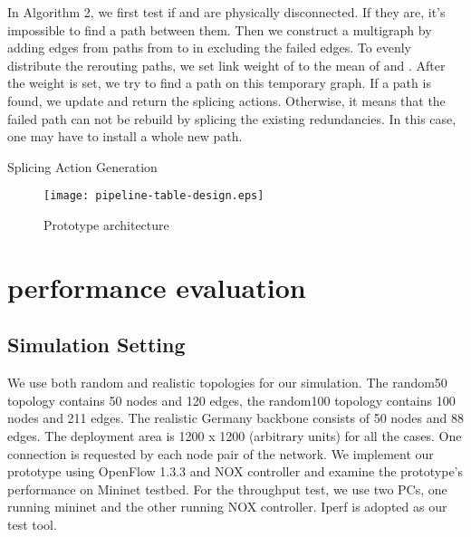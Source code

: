 \documentclass[10pt,journal]{IEEEtran}
\begin{document}
In Algorithm 2, we first test if  and  are physically disconnected. If they are, it's impossible to find a path between them. Then we construct a multigraph  by adding edges from  paths from  to  in  excluding the failed edges. To evenly distribute the rerouting paths, we set link weight of  to the mean of  and . After the weight is set, we try to find a path on this temporary graph. If a path is found, we update  and return the splicing actions. Otherwise, it means that the failed path can not be rebuild by splicing the existing redundancies. In this case, one may have to install a whole new path.
\begin{algorithm}[!ht]
\caption{Splicing Action Generation}
\label{algo:s_a_g}
\end{algorithm}


\begin{figure}[!h]
 \begin{center}
		\texttt{[image: pipeline-table-design.eps]}
	\caption{Prototype architecture}
	\label{fig:proposed_architecture}
 \end{center}
\end{figure}


\section{performance evaluation}\label{sec:performance_evaluation}
\subsection{Simulation Setting}
 We use both random and realistic topologies for our simulation. The random50 topology contains 50 nodes and 120 edges, the random100 topology contains 100 nodes and 211 edges. The realistic Germany backbone consists of 50 nodes and 88 edges. The deployment area is 1200 x 1200 (arbitrary units) for all the cases. One connection is requested by each node pair of the network. We implement our prototype using OpenFlow 1.3.3\cite{specification2013version} and NOX controller\cite{gude2008nox} and examine the prototype's performance on Mininet testbed\cite{lantz2010network}. For the throughput test, we use two PCs, one running mininet and the other running NOX controller. Iperf \cite{tirumala2005iperf} is adopted as our test tool.
\end{document}
